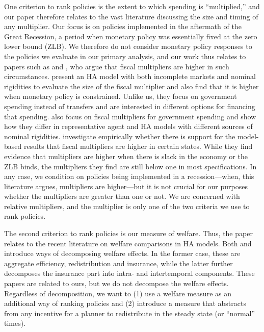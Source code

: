 \documentclass[\econtexRoot/HAFiscal]{subfiles}
\begin{document}
One criterion to rank policies is the extent to which spending is ``multiplied,'' and our paper therefore relates to the vast literature discussing the size and timing of any multiplier. Our focus is on policies implemented in the aftermath of the Great Recession, a period when monetary policy was essentially fixed at the zero lower bound (ZLB). We therefore do not consider monetary policy responses to the policies we evaluate in our primary analysis, and our work thus relates to papers such as \cite{christiano2011government} and \cite{eggertsson2011fiscal}, who argue that fiscal multipliers are higher in such circumstances. \cite{hagedorn2019fiscal} present an HA model with both incomplete markets and nominal rigidities to evaluate the size of the fiscal multiplier and also find that it is higher when monetary policy is constrained. Unlike us, they focus on government spending instead of transfers and are interested in different options for financing that spending. \cite{broer2023fiscalmultipliers} also focus on fiscal multipliers for government spending and show how they differ in representative agent and HA models with different sources of nominal rigidities. \cite{ramey2018government} investigate empirically whether there is support for the model-based results that fiscal multipliers are higher in certain states. While they find evidence that multipliers are higher when there is slack in the economy or the ZLB binds, the multipliers they find are still below one in most specifications. In any case, we condition on policies being implemented in a recession---when, this literature argues, multipliers are higher---but it is not crucial for our purposes whether the multipliers are greater than one or not. We are concerned with relative multipliers, and the multiplier is only one of the two criteria we use to rank policies. 

The second criterion to rank policies is our measure of welfare. Thus, the paper relates to the recent literature on welfare comparisons in HA models. Both \cite{bhandari2021efficiency} and \cite{davila2022welfare} introduce ways of decomposing welfare effects. In the former case, these are aggregate efficiency, redistribution and insurance, while the latter further decomposes the insurance part into intra- and intertemporal components. These papers are related to ours, but we do not decompose the welfare effects. Regardless of decomposition, we want to (1) use a welfare measure as an additional way of ranking policies and (2) introduce a measure that abstracts from any incentive for a planner to redistribute in the steady state (or ``normal'' times).
\end{document}
